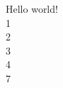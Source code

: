 \documentclass{article}
\begin{document}
    Hello world!
    \\1
    \\2
    \\3
    \\4
    \\7
\end{document}
